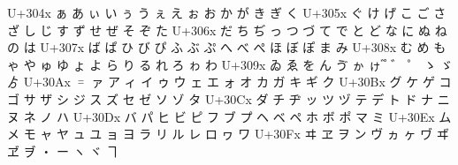 \documentclass{ltjarticle}
\begin{document}
\large 
{\obeylines\ttfamily
U+304x          ぁ      あ      ぃ      い      ぅ      う      ぇ      え      ぉ      お      か      が      き      ぎ      く
U+305x  ぐ      け      げ      こ      ご      さ      ざ      し      じ      す      ず      せ      ぜ      そ      ぞ      た
U+306x  だ      ち      ぢ      っ      つ      づ      て      で      と      ど      な      に      ぬ      ね      の      は
U+307x  ば      ぱ      ひ      び      ぴ      ふ      ぶ      ぷ      へ      べ      ぺ      ほ      ぼ      ぽ      ま      み
U+308x  む      め      も      ゃ      や      ゅ      ゆ      ょ      よ      ら      り      る      れ      ろ      ゎ      わ
U+309x  ゐ      ゑ      を      ん      ゔ      ゕ      ゖ                      ゙        ゚        ゛      ゜      ゝ      ゞ      ゟ 
U+30Ax  ゠      ァ      ア      ィ      イ      ゥ      ウ      ェ      エ      ォ      オ      カ      ガ      キ      ギ      ク
U+30Bx  グ      ケ      ゲ      コ      ゴ      サ      ザ      シ      ジ      ス      ズ      セ      ゼ      ソ      ゾ      タ
U+30Cx  ダ      チ      ヂ      ッ      ツ      ヅ      テ      デ      ト      ド      ナ      ニ      ヌ      ネ      ノ      ハ
U+30Dx  バ      パ      ヒ      ビ      ピ      フ      ブ      プ      ヘ      ベ      ペ      ホ      ボ      ポ      マ      ミ
U+30Ex  ム      メ      モ      ャ      ヤ      ュ      ユ      ョ      ヨ      ラ      リ      ル      レ      ロ      ヮ      ワ
U+30Fx  ヰ      ヱ      ヲ      ン      ヴ      ヵ      ヶ      ヷ      ヸ      ヹ      ヺ      ・      ー      ヽ      ヾ      ヿ 
\par}

\bigskip
\def\CB{\char"3099 }\def\CD{\char"309A }
\end{document}
